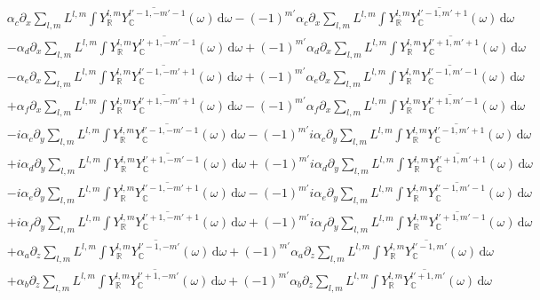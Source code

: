\documentclass{egpubl}
\newcommand{\ud}{\,\mathrm{d}} %
\newcommand{\SHBR}{Y_{\mathbb{R}}} %
\begin{document}
\begin{align*}
&
\alpha_c\partial_x\sum_{l,m}L^{l,m}\int{\SHBR^{l,m}\overline{Y_{\mathbb{C}}^{l'-1, -m'-1}}(\omega )\ud\omega}
-\left({-1}\right)^{m'}\alpha_c\partial_x\sum_{l,m}L^{l,m}\int{\SHBR^{l,m}\overline{Y_{\mathbb{C}}^{l'-1, m'+1}}(\omega )\ud\omega}
\\&
-\alpha_d\partial_x\sum_{l,m}L^{l,m}\int{\SHBR^{l,m}\overline{Y_{\mathbb{C}}^{l'+1, -m'-1}}(\omega )\ud\omega}
+\left({-1}\right)^{m'}\alpha_d\partial_x\sum_{l,m}L^{l,m}\int{\SHBR^{l,m}\overline{Y_{\mathbb{C}}^{l'+1, m'+1}}(\omega )\ud\omega}
\\&
-\alpha_e\partial_x\sum_{l,m}L^{l,m}\int{\SHBR^{l,m}\overline{Y_{\mathbb{C}}^{l'-1, -m'+1}}(\omega )\ud\omega}
+\left({-1}\right)^{m'}\alpha_e\partial_x\sum_{l,m}L^{l,m}\int{\SHBR^{l,m}\overline{Y_{\mathbb{C}}^{l'-1, m'-1}}(\omega )\ud\omega}
\\&
+\alpha_f\partial_x\sum_{l,m}L^{l,m}\int{\SHBR^{l,m}\overline{Y_{\mathbb{C}}^{l'+1, -m'+1}}(\omega )\ud\omega}
-\left({-1}\right)^{m'}\alpha_f\partial_x\sum_{l,m}L^{l,m}\int{\SHBR^{l,m}\overline{Y_{\mathbb{C}}^{l'+1, m'-1}}(\omega )\ud\omega}
\\&
-i \alpha_c\partial_y\sum_{l,m}L^{l,m}\int{\SHBR^{l,m}\overline{Y_{\mathbb{C}}^{l'-1, -m'-1}}(\omega )\ud\omega}
-\left({-1}\right)^{m'}i \alpha_c\partial_y\sum_{l,m}L^{l,m}\int{\SHBR^{l,m}\overline{Y_{\mathbb{C}}^{l'-1, m'+1}}(\omega )\ud\omega}
\\&
+i \alpha_d\partial_y\sum_{l,m}L^{l,m}\int{\SHBR^{l,m}\overline{Y_{\mathbb{C}}^{l'+1, -m'-1}}(\omega )\ud\omega}
+\left({-1}\right)^{m'}i \alpha_d\partial_y\sum_{l,m}L^{l,m}\int{\SHBR^{l,m}\overline{Y_{\mathbb{C}}^{l'+1, m'+1}}(\omega )\ud\omega}
\\&
-i \alpha_e\partial_y\sum_{l,m}L^{l,m}\int{\SHBR^{l,m}\overline{Y_{\mathbb{C}}^{l'-1, -m'+1}}(\omega )\ud\omega}
-\left({-1}\right)^{m'}i \alpha_e\partial_y\sum_{l,m}L^{l,m}\int{\SHBR^{l,m}\overline{Y_{\mathbb{C}}^{l'-1, m'-1}}(\omega )\ud\omega}
\\&
+i \alpha_f\partial_y\sum_{l,m}L^{l,m}\int{\SHBR^{l,m}\overline{Y_{\mathbb{C}}^{l'+1, -m'+1}}(\omega )\ud\omega}
+\left({-1}\right)^{m'}i \alpha_f\partial_y\sum_{l,m}L^{l,m}\int{\SHBR^{l,m}\overline{Y_{\mathbb{C}}^{l'+1, m'-1}}(\omega )\ud\omega}
\\&
+\alpha_a\partial_z\sum_{l,m}L^{l,m}\int{\SHBR^{l,m}\overline{Y_{\mathbb{C}}^{l'-1, -m'}}(\omega )\ud\omega}
+\left({-1}\right)^{m'}\alpha_a\partial_z\sum_{l,m}L^{l,m}\int{\SHBR^{l,m}\overline{Y_{\mathbb{C}}^{l'-1, m'}}(\omega )\ud\omega}
\\&
+\alpha_b\partial_z\sum_{l,m}L^{l,m}\int{\SHBR^{l,m}\overline{Y_{\mathbb{C}}^{l'+1, -m'}}(\omega )\ud\omega}
+\left({-1}\right)^{m'}\alpha_b\partial_z\sum_{l,m}L^{l,m}\int{\SHBR^{l,m}\overline{Y_{\mathbb{C}}^{l'+1, m'}}(\omega )\ud\omega}
\end{align*}
\end{document}
